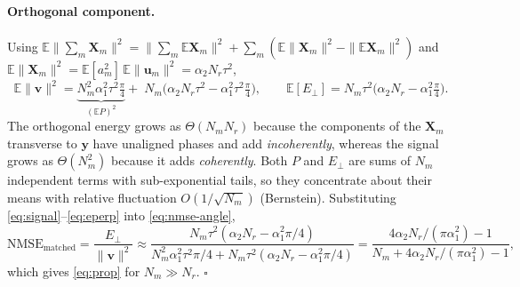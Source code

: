 \paragraph{Orthogonal component.} Using
$\mathbb{E}\|\sum_m\mathbf{X}_m\|^2=\|\sum_m\mathbb{E}\mathbf{X}_m\|^2+\sum_m(\mathbb{E}\|\mathbf{X}_m\|^2-\|\mathbb{E}\mathbf{X}_m\|^2)$
and $\mathbb{E}\|\mathbf{X}_m\|^2=\mathbb{E}[a_m^2]\,\mathbb{E}\|\mathbf{u}_m\|^2=\alpha_2 N_r\tau^2$,
\begin{equation}
  \mathbb{E}\|\mathbf{v}\|^2=\underbrace{N_m^2\alpha_1^2\tau^2\tfrac{\pi}{4}}_{(\mathbb{E}P)^2}
  +\;N_m\big(\alpha_2 N_r\tau^2-\alpha_1^2\tau^2\tfrac{\pi}{4}\big),
  \qquad
  \mathbb{E}[E_\perp]=N_m\tau^2\big(\alpha_2 N_r-\alpha_1^2\tfrac{\pi}{4}\big).
  \label{eq:eperp}
\end{equation}
The orthogonal energy grows as $\Theta(N_m N_r)$ because the components of the $\mathbf{X}_m$
transverse to $\mathbf{y}$ have unaligned phases and add \emph{incoherently}, whereas the signal grows
as $\Theta(N_m^2)$ because it adds \emph{coherently}. Both $P$ and $E_\perp$ are sums of $N_m$
independent terms with sub-exponential tails, so they concentrate about their means with relative
fluctuation $O(1/\sqrt{N_m})$ (Bernstein). Substituting \eqref{eq:signal}--\eqref{eq:eperp} into
\eqref{eq:nmse-angle},
\begin{equation}
  \mathrm{NMSE}_{\mathrm{matched}}=\frac{E_\perp}{\|\mathbf{v}\|^2}
  \approx\frac{N_m\tau^2(\alpha_2 N_r-\alpha_1^2\pi/4)}
  {N_m^2\alpha_1^2\tau^2\pi/4+N_m\tau^2(\alpha_2 N_r-\alpha_1^2\pi/4)}
  =\frac{4\alpha_2 N_r/(\pi\alpha_1^2)-1}{N_m+4\alpha_2 N_r/(\pi\alpha_1^2)-1},
  \label{eq:exact-frac}
\end{equation}
which gives \eqref{eq:prop} for $N_m\gg N_r$. \hfill$\square$

